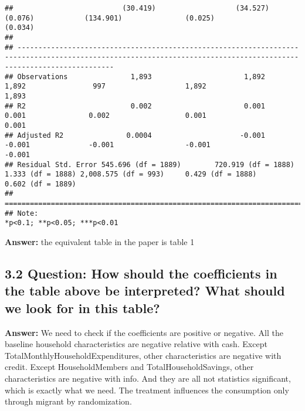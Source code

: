 \documentclass[
]{article}
\begin{document}
\begin{verbatim}
##                          (30.419)                   (34.527)                   (0.076)            (134.901)               (0.025)                  (0.034)         
##                                                                                                                                                                    
## -------------------------------------------------------------------------------------------------------------------------------------------------------------------
## Observations               1,893                      1,892                     1,892                997                   1,892                    1,893          
## R2                         0.002                      0.001                     0.001               0.002                  0.001                    0.001          
## Adjusted R2               0.0004                     -0.001                    -0.001              -0.001                 -0.001                   -0.001          
## Residual Std. Error 545.696 (df = 1889)        720.919 (df = 1888)        1.333 (df = 1888) 2,008.575 (df = 993)     0.429 (df = 1888)        0.602 (df = 1889)    
## ===================================================================================================================================================================
## Note:                                                                                                                                   *p<0.1; **p<0.05; ***p<0.01
\end{verbatim}

\textbf{Answer:} the equivalent table in the paper is table 1

\clearpage

\hypertarget{question-how-should-the-coefficients-in-the-table-above-be-interpreted-what-should-we-look-for-in-this-table}{%
\subsection{\texorpdfstring{3.2 \textbf{Question: How should the
coefficients in the table above be interpreted? What should we look for
in this
table?}}{3.2 Question: How should the coefficients in the table above be interpreted? What should we look for in this table?}}\label{question-how-should-the-coefficients-in-the-table-above-be-interpreted-what-should-we-look-for-in-this-table}}

\textbf{Answer:} We need to check if the coefficients are positive or
negative. All the baseline household characteristics are negative
relative with cash. Except TotalMonthlyHouseholdExpenditures, other
characteristics are negative with credit. Except HouseholdMembers and
TotalHouseholdSavings, other characteristics are negative with info. And
they are all not statistics significant, which is exactly what we need.
The treatment influences the consumption only through migrant by
randomization.
\end{document}
